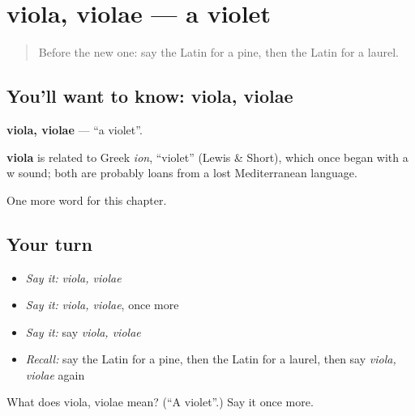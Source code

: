 \section[viola, violae]{viola, violae — a violet}

\label{lesson:LA-C250-viola}



\begin{quote}
Before the new one: say the Latin for a pine, then the Latin for a laurel.
\end{quote}

\subsection*{You'll want to know: viola, violae}
\textbf{viola, violae} — \textquotedblleft{}a violet\textquotedblright{}.

\begin{cousinweb}
\textbf{viola} is related to Greek \emph{ion}, \textquotedblleft{}violet\textquotedblright{} (Lewis \& Short), which once began with a w sound; both are probably loans from a lost Mediterranean language.
\end{cousinweb}

\begin{grammarlens}[title={What you've built}]
One more word for this chapter.
\end{grammarlens}

\subsection*{Your turn}
\begin{itemize}
\raggedright
  \item \emph{Say it:} \emph{viola, violae}
  \item \emph{Say it:} \emph{viola, violae}, once more
  \item \emph{Say it:} say \emph{viola, violae}
  \item \emph{Recall:} say the Latin for a pine, then the Latin for a laurel, then say \emph{viola, violae} again
\end{itemize}

\begin{tcolorbox}[breakable,colback=teal!4,colframe=teal!35!black,title={Before you move on}]
What does viola, violae mean? (\textquotedblleft{}A violet\textquotedblright{}.) Say it once more.
\end{tcolorbox}
